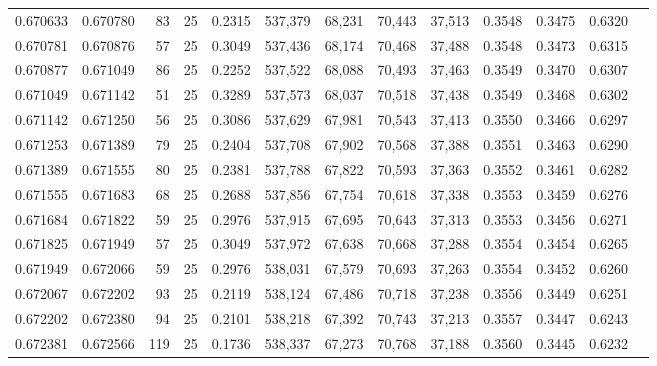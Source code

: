 \begin{tabular}{rrrrrrrrrrrrr}
0.670633 & 0.670780 &    83 &  25 &                                     0.2315 & 537,379 &  68,231 &  70,443 &  37,513 & 0.3548 & 0.3475 & 0.6320 \\
0.670781 & 0.670876 &    57 &  25 &                                     0.3049 & 537,436 &  68,174 &  70,468 &  37,488 & 0.3548 & 0.3473 & 0.6315 \\
0.670877 & 0.671049 &    86 &  25 &                                     0.2252 & 537,522 &  68,088 &  70,493 &  37,463 & 0.3549 & 0.3470 & 0.6307 \\
0.671049 & 0.671142 &    51 &  25 &                                     0.3289 & 537,573 &  68,037 &  70,518 &  37,438 & 0.3549 & 0.3468 & 0.6302 \\
0.671142 & 0.671250 &    56 &  25 &                                     0.3086 & 537,629 &  67,981 &  70,543 &  37,413 & 0.3550 & 0.3466 & 0.6297 \\
0.671253 & 0.671389 &    79 &  25 &                                     0.2404 & 537,708 &  67,902 &  70,568 &  37,388 & 0.3551 & 0.3463 & 0.6290 \\
0.671389 & 0.671555 &    80 &  25 &                                     0.2381 & 537,788 &  67,822 &  70,593 &  37,363 & 0.3552 & 0.3461 & 0.6282 \\
0.671555 & 0.671683 &    68 &  25 &                                     0.2688 & 537,856 &  67,754 &  70,618 &  37,338 & 0.3553 & 0.3459 & 0.6276 \\
0.671684 & 0.671822 &    59 &  25 &                                     0.2976 & 537,915 &  67,695 &  70,643 &  37,313 & 0.3553 & 0.3456 & 0.6271 \\
0.671825 & 0.671949 &    57 &  25 &                                     0.3049 & 537,972 &  67,638 &  70,668 &  37,288 & 0.3554 & 0.3454 & 0.6265 \\
0.671949 & 0.672066 &    59 &  25 &                                     0.2976 & 538,031 &  67,579 &  70,693 &  37,263 & 0.3554 & 0.3452 & 0.6260 \\
0.672067 & 0.672202 &    93 &  25 &                                     0.2119 & 538,124 &  67,486 &  70,718 &  37,238 & 0.3556 & 0.3449 & 0.6251 \\
0.672202 & 0.672380 &    94 &  25 &                                     0.2101 & 538,218 &  67,392 &  70,743 &  37,213 & 0.3557 & 0.3447 & 0.6243 \\
0.672381 & 0.672566 &   119 &  25 &                                     0.1736 & 538,337 &  67,273 &  70,768 &  37,188 & 0.3560 & 0.3445 & 0.6232 \\

\end{tabular}
